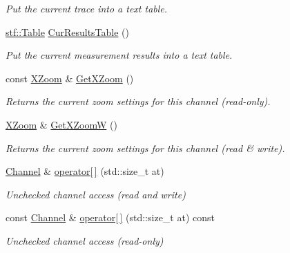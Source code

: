\begin{DoxyCompactItemize}
\begin{DoxyCompactList}\small\item\em Put the current trace into a text table. \item\end{DoxyCompactList}\item 
\hypertarget{classRecording_ae74b9415040ff2fc6d8322f2d3e5a514}{
\hyperlink{classstf_1_1Table}{stf::Table} \hyperlink{classRecording_ae74b9415040ff2fc6d8322f2d3e5a514}{CurResultsTable} ()}
\label{classRecording_ae74b9415040ff2fc6d8322f2d3e5a514}

\begin{DoxyCompactList}\small\item\em Put the current measurement results into a text table. \item\end{DoxyCompactList}\item 
const \hyperlink{classXZoom}{XZoom} \& \hyperlink{classRecording_a6fbc069d9420dd89c819b398509de390}{GetXZoom} ()
\begin{DoxyCompactList}\small\item\em Returns the current zoom settings for this channel (read-\/only). \item\end{DoxyCompactList}\item 
\hyperlink{classXZoom}{XZoom} \& \hyperlink{classRecording_a9ab5fd2ca72ccff30189a0a0c5bce5b1}{GetXZoomW} ()
\begin{DoxyCompactList}\small\item\em Returns the current zoom settings for this channel (read \& write). \item\end{DoxyCompactList}\item 
\hyperlink{classChannel}{Channel} \& \hyperlink{classRecording_a17c7f1c4c9255f050d3df85931182c89}{operator\mbox{[}$\,$\mbox{]}} (std::size\_\-t at)
\begin{DoxyCompactList}\small\item\em Unchecked channel access (read and write) \item\end{DoxyCompactList}\item 
const \hyperlink{classChannel}{Channel} \& \hyperlink{classRecording_a47f455f0d3e6caa74527c8768fa2ae24}{operator\mbox{[}$\,$\mbox{]}} (std::size\_\-t at) const 
\begin{DoxyCompactList}\small\item\em Unchecked channel access (read-\/only) \item\end{DoxyCompactList}\end{DoxyCompactItemize}


